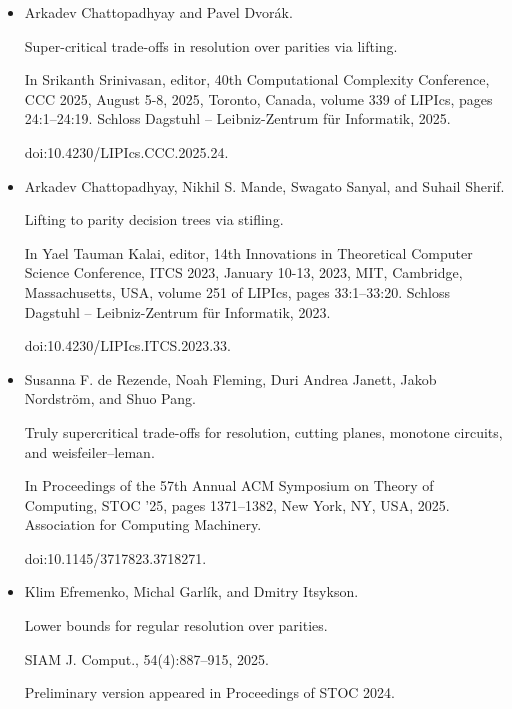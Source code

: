 \documentclass[10pt,a4paper]{article}
\begin{document}
\begin{itemize}
\item 
[14]

Arkadev Chattopadhyay and Pavel Dvorák.


Super-critical trade-offs in resolution over parities via lifting.


In Srikanth Srinivasan, editor, 40th Computational Complexity
Conference, CCC 2025, August 5-8, 2025, Toronto, Canada, volume 339 of
LIPIcs, pages 24:1–24:19. Schloss Dagstuhl – Leibniz-Zentrum für
Informatik, 2025.


doi:10.4230/LIPIcs.CCC.2025.24.





\item 
[15]

Arkadev Chattopadhyay, Nikhil S. Mande, Swagato Sanyal, and Suhail Sherif.


Lifting to parity decision trees via stifling.


In Yael Tauman Kalai, editor, 14th Innovations in Theoretical
Computer Science Conference, ITCS 2023, January 10-13, 2023, MIT,
Cambridge, Massachusetts, USA, volume 251 of LIPIcs, pages
33:1–33:20. Schloss Dagstuhl – Leibniz-Zentrum für Informatik, 2023.


doi:10.4230/LIPIcs.ITCS.2023.33.





\item 
[16]

Susanna F. de Rezende, Noah Fleming, Duri Andrea Janett, Jakob Nordström,
and Shuo Pang.


Truly supercritical trade-offs for resolution, cutting planes,
monotone circuits, and weisfeiler–leman.


In Proceedings of the 57th Annual ACM Symposium on Theory of
Computing, STOC ’25, pages 1371–1382, New York, NY, USA, 2025. Association
for Computing Machinery.


doi:10.1145/3717823.3718271.





\item 
[17]

Klim Efremenko, Michal Garlík, and Dmitry Itsykson.


Lower bounds for regular resolution over parities.


SIAM J. Comput., 54(4):887–915, 2025.


Preliminary version appeared in Proceedings of STOC 2024.



\end{itemize}
\end{document}
